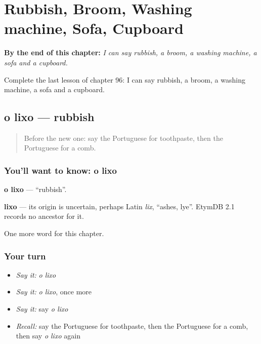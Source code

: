 
\chapter{Rubbish, Broom, Washing machine, Sofa, Cupboard}
\label{ch:pt-rubbish-broom-washing-machine-sofa-cupboard}

\begin{chapteropening}
\textbf{By the end of this chapter:} \emph{I can say rubbish, a broom, a washing machine, a sofa and a cupboard.}

Complete the last lesson of chapter 96: I can say rubbish, a broom, a washing machine, a sofa and a cupboard.
\end{chapteropening}

\section[o lixo]{o lixo — rubbish}

\label{lesson:PT-C96-lixo}



\begin{quote}
Before the new one: say the Portuguese for toothpaste, then the Portuguese for a comb.
\end{quote}

\subsection*{You'll want to know: o lixo}
\textbf{o lixo} — \textquotedblleft{}rubbish\textquotedblright{}.

\begin{cousinweb}
\textbf{lixo} — its origin is uncertain, perhaps Latin \emph{lix}, \textquotedblleft{}ashes, lye\textquotedblright{}. EtymDB 2.1 records no ancestor for it.
\end{cousinweb}

\begin{grammarlens}[title={What you've built}]
One more word for this chapter.
\end{grammarlens}

\subsection*{Your turn}
\begin{itemize}
\raggedright
  \item \emph{Say it:} \emph{o lixo}
  \item \emph{Say it:} \emph{o lixo}, once more
  \item \emph{Say it:} say \emph{o lixo}
  \item \emph{Recall:} say the Portuguese for toothpaste, then the Portuguese for a comb, then say \emph{o lixo} again
\end{itemize}

